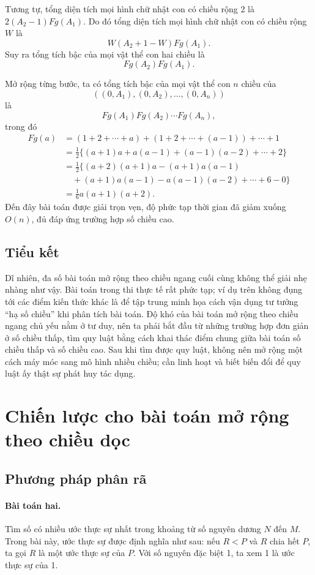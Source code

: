 \documentclass[11pt]{article}
\begin{document}
Tương tự, tổng diện tích mọi hình chữ nhật con có chiều rộng 2 là
\(2(A_2-1)Fg(A_1)\). Do đó tổng diện tích mọi hình chữ nhật con có chiều rộng
\(W\) là
\[
W(A_2+1-W)Fg(A_1).
\]
Suy ra tổng tích bậc của mọi vật thể con hai chiều là
\[
Fg(A_2)Fg(A_1).
\]

Mở rộng từng bước, ta có tổng tích bậc của mọi vật thể con \(n\) chiều của
\[
((0,A_1),(0,A_2),\ldots,(0,A_n))
\]
là
\[
Fg(A_1)Fg(A_2)\cdots Fg(A_n),
\]
trong đó
\[
\begin{aligned}
Fg(a)
  &= (1+2+\cdots+a)+(1+2+\cdots+(a-1))+\cdots+1\\
  &= \frac12\{(a+1)a+a(a-1)+(a-1)(a-2)+\cdots+2\}\\
  &= \frac12\{(a+2)(a+1)a-(a+1)a(a-1)\\
  &\quad +(a+1)a(a-1)-a(a-1)(a-2)+\cdots+6-0\}\\
  &= \frac16 a(a+1)(a+2).
\end{aligned}
\]
Đến đây bài toán được giải trọn vẹn, độ phức tạp thời gian đã giảm xuống
\(O(n)\), đủ đáp ứng trường hợp số chiều cao.

\subsection{Tiểu kết}

Dĩ nhiên, đa số bài toán mở rộng theo chiều ngang cuối cùng không thể giải
nhẹ nhàng như vậy. Bài toán trong thi thực tế rất phức tạp; ví dụ trên không
đụng tới các điểm kiến thức khác là để tập trung minh họa cách vận dụng tư
tưởng ``hạ số chiều'' khi phân tích bài toán. Độ khó của bài toán mở rộng
theo chiều ngang chủ yếu nằm ở tư duy, nên ta phải bắt đầu từ những trường
hợp đơn giản ở số chiều thấp, tìm quy luật bằng cách khai thác điểm chung
giữa bài toán số chiều thấp và số chiều cao. Sau khi tìm được quy luật, không
nên mở rộng một cách máy móc sang mô hình nhiều chiều; cần linh hoạt và biết
biến đổi để quy luật ấy thật sự phát huy tác dụng.

\section{Chiến lược cho bài toán mở rộng theo chiều dọc}

\subsection{Phương pháp phân rã}

\paragraph{Bài toán hai.}
Tìm số có nhiều ước thực sự nhất trong khoảng từ số nguyên dương \(N\) đến
\(M\). Trong bài này, ước thực sự được định nghĩa như sau: nếu \(R<P\) và
\(R\) chia hết \(P\), ta gọi \(R\) là một ước thực sự của \(P\). Với số nguyên
đặc biệt 1, ta xem 1 là ước thực sự của 1.
\end{document}
